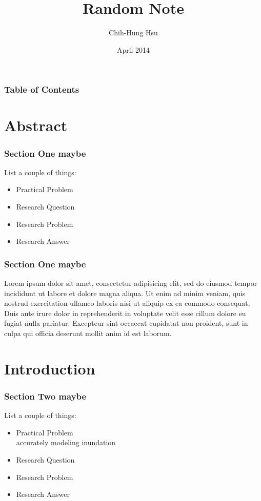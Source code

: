 \documentclass{beamer}
\title[About Beamer] %
{Random Note}
\subtitle{}
\author[] %
{Chih-Hung Hsu}
\date[GTI 2019] %
{April 2014}
\begin{document}
\frame{\titlepage}


\begin{frame}
\frametitle{Table of Contents}
\tableofcontents
\end{frame}

\section{Abstract}
\begin{frame}
\frametitle{Section One maybe}
List a couple of things:

\begin{itemize}
  \item Practical Problem
  \item Research Question
  \item Research Problem
  \item Research Answer
\end{itemize}
\end{frame}


\begin{frame}
\frametitle{Section One maybe}
Lorem ipsum dolor sit amet, consectetur adipisicing elit, sed do eiusmod
tempor incididunt ut labore et dolore magna aliqua. Ut enim ad minim veniam,
quis nostrud exercitation ullamco laboris nisi ut aliquip ex ea commodo
consequat. Duis aute irure dolor in reprehenderit in voluptate velit esse
cillum dolore eu fugiat nulla pariatur. Excepteur sint occaecat cupidatat non
proident, sunt in culpa qui officia deserunt mollit anim id est laborum. 
\end{frame}


\section{Introduction}
\begin{frame}
\frametitle{Section Two maybe}
List a couple of things:

\begin{itemize}
  \item Practical Problem\\
  accurately modeling inundation
  \item Research Question
  \item Research Problem
  \item Research Answer
\end{itemize}
\end{frame}
\end{document}
